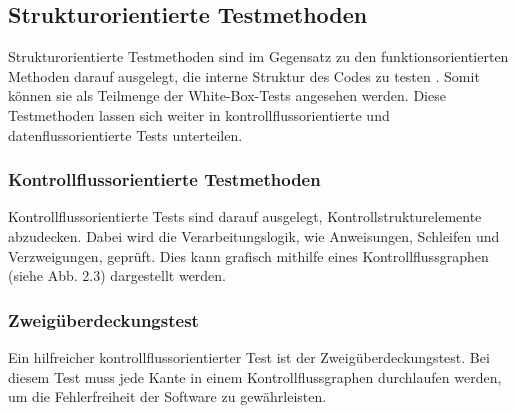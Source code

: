 \documentclass[	%
		fontsize=11pt,  %
		a4paper,	    %
		ngerman,		%
		sans,			%
		f4,				%
	]{HsH-report}		%
\begin{document}
\subsection{Strukturorientierte Testmethoden}

Strukturorientierte Testmethoden sind im Gegensatz zu den funktionsorientierten
Methoden darauf ausgelegt, die interne Struktur des Codes zu testen
\cite{liggesmeyer:qualitaet}. Somit können sie als Teilmenge der
White-Box-Tests angesehen werden. Diese Testmethoden lassen sich weiter in
kontrollflussorientierte und datenflussorientierte Tests unterteilen.

\subsubsection{Kontrollflussorientierte Testmethoden}

Kontrollflussorientierte Tests sind darauf ausgelegt, Kontrollstrukturelemente
abzudecken. Dabei wird die Verarbeitungslogik, wie Anweisungen, Schleifen und
Verzweigungen, geprüft. Dies kann grafisch mithilfe eines Kontrollflussgraphen
(siehe Abb. 2.3) dargestellt werden. \cite{liggesmeyer:qualitaet}

\subsubsection{Zweigüberdeckungstest}
Ein hilfreicher kontrollflussorientierter Test ist der Zweigüberdeckungstest.
Bei diesem Test muss jede Kante in einem Kontrollflussgraphen durchlaufen
werden, um die Fehlerfreiheit der Software zu gewährleisten.
\cite{liggesmeyer:qualitaet}
\end{document}
